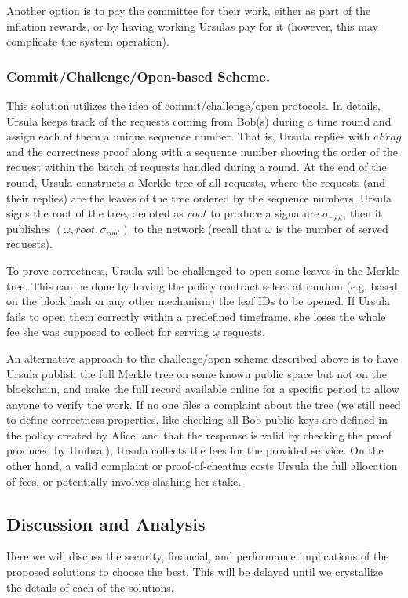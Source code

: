 Another option is to pay the committee for their work, either as
part of the inflation rewards, or by having working Ursulas pay for 
it (however, this may complicate the system operation).


\subsubsection{Commit/Challenge/Open-based Scheme.}
This solution utilizes the idea of commit/challenge/open protocols. 
In details, Ursula keeps track of the requests coming from Bob(s) 
during a time round and assign each of them a unique sequence 
number. That is, Ursula replies with $cFrag$ and the correctness proof 
along with a sequence number showing the order of the request within 
the batch of requests handled during a round. At the end of the round, 
Ursula constructs a Merkle tree of all requests, where 
the requests (and their replies) are the leaves of the tree ordered by the sequence
numbers. Ursula signs the root of the tree, denoted as $root$ to produce 
a signature $\sigma_{root}$, then it publishes $(\omega, root, \sigma_{root})$ 
to the network (recall that $\omega$ is the number of served requests). 


To prove correctness, Ursula will be challenged to open some leaves in the Merkle tree. 
This can be done by having the policy contract select at random (e.g. based
on the block hash or any other mechanism) the leaf IDs to be opened. If 
Ursula fails to open them correctly within a predefined timeframe, she loses the 
whole fee she was supposed to collect for serving $\omega$ requests.


An alternative approach to the challenge/open scheme described above is to 
have Ursula publish the full Merkle tree on some known public space but
not on the blockchain, and make the full record available online for a specific period
to allow anyone to verify the work. If no one files a complaint about the tree (we
still need to define correctness properties, like checking all Bob public keys are 
defined in the policy created by Alice, and that the response is valid by checking the 
proof produced by Umbral), Ursula collects the fees for the provided service. On the other
hand, a valid complaint or proof-of-cheating costs Ursula the full allocation of fees, or potentially involves slashing her stake.


\subsection{Discussion and Analysis}
\label{analysis}
Here we will discuss the security, financial, and performance implications of the 
proposed solutions to choose the best. This will be delayed until we crystallize the 
details of each of the solutions.


